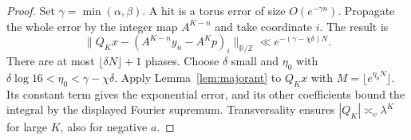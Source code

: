 \documentclass[11pt,a4paper,reqno]{amsart}
\theoremstyle{definition}
\theoremstyle{remark}
\numberwithin{equation}{section}
\begin{document}
\begin{proof}
Set \(\gamma=\min(\alpha,\beta)\). A hit is a torus error of size
\(O(e^{-\gamma n})\). Propagate the whole error by the integer map
\(A^{K-n}\) and take coordinate \(i\). The result is
\[
 \|Q_Kx-(A^{K-n}y_n-A^Kp)_i\|_{\mathbb R/\mathbb Z}
 \ll e^{-(\gamma-\chi\delta)N}.
\]
There are at most \(\lfloor\delta N\rfloor+1\) phases. Choose
\(\delta\) small and \(\eta_0\) with
\(\delta\log16<\eta_0<\gamma-\chi\delta\).
Apply Lemma~\ref{lem:majorant} to \(Q_Kx\) with
\(M=\lfloor e^{\eta_0 N}\rfloor\). Its constant term gives the
exponential error, and its other coefficients bound the integral by
the displayed Fourier supremum. Transversality ensures
\(|Q_K|\asymp_v\lambda^K\) for large \(K\), also for negative \(a\).
\end{proof}
\end{document}
